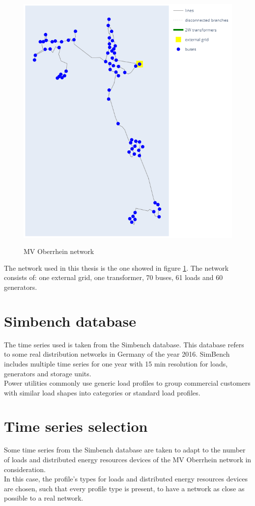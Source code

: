 \begin{figure}[H] 
\centering
\subfloat
    {\includegraphics[width=0.4\linewidth]
    {images/MVOberr/MVOberr_half1.png}}
\caption[MV Oberrhein network division]{MV Oberrhein network}
\label{fig:MVObbB}
\end{figure}

\noindent The network used in this thesis is the one showed in figure \ref{fig:MVObbB}. The network consists of: one external grid, one transformer, 70 buses, 61 loads and 60 generators.

\section{Simbench database}
The time series used is taken from the Simbench database. This database refers to some real distribution networks in Germany of the year 2016. SimBench includes multiple time series for one year with 15 min resolution for loads, generators and storage units.\\

Power utilities commonly use generic load profiles to group commercial customers with similar load shapes into categories or standard load profiles.

\section{Time series selection}
Some time series from the Simbench database are taken to adapt to the number of loads and distributed energy resources devices of the MV Oberrhein network in consideration. \\

In this case, the profile's types for loads and distributed energy resources devices are chosen, such that every profile type is present, to have a network as close as possible to a real network. \\

